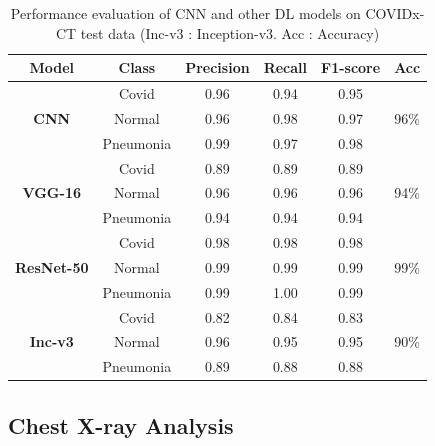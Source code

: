 \documentclass[10pt,journal,compsoc]{IEEEtran}
\begin{document}
\begin{table}
\renewcommand{\arraystretch}{1.3}
\caption{Performance evaluation of CNN and other DL models on COVIDx-CT test data (Inc-v3 : Inception-v3. Acc : Accuracy)}\label{table_5}
\begin{tabular}{|c|c|c|c|c|c|}
    \hline
    
    \bfseries Model & \bfseries  Class     & \bfseries  Precision    & \bfseries Recall      & \bfseries F1-score   & \bfseries Acc   \\
    \hline
    \multirow{3}{*}{\bfseries CNN} & Covid      & 0.96        & 0.94          & 0.95     &  \multirow{3}{*}{96\%}\\ 
    \cline{2-5}
    &    Normal     & 0.96        & 0.98          & 0.97             &    \\
    \cline{2-5}
    &    Pneumonia  & 0.99        & 0.97          & 0.98      &    \\
    \hline
    \multirow{3}{*}{\bfseries VGG-16} & Covid &  0.89          & 0.89          & 0.89     & \multirow{3}{*}{94\%}\\
    \cline{2-5}
    & Normal & 0.96          & 0.96          & 0.96  & \\
    \cline{2-5}
    & Pneumonia & 0.94          & 0.94          & 0.94   &   \\
    \hline
    \multirow{3}{*}{\bfseries ResNet-50} & Covid &  0.98          & 0.98          & 0.98     & \multirow{3}{*}{99\%}\\
    \cline{2-5}
    & Normal & 0.99          & 0.99          & 0.99  & \\
    \cline{2-5}
    & Pneumonia & 0.99          & 1.00          & 0.99   &   \\
    \hline
    \multirow{3}{*}{\bfseries Inc-v3} & Covid &  0.82          & 0.84          & 0.83     & \multirow{3}{*}{90\%}\\
    \cline{2-5}
    & Normal & 0.96          & 0.95          & 0.95  & \\
    \cline{2-5}
    & Pneumonia & 0.89          & 0.88          & 0.88   &   \\
    \hline
    \end{tabular} 
     \end{table}


\subsection{Chest X-ray Analysis}

\end{document}
